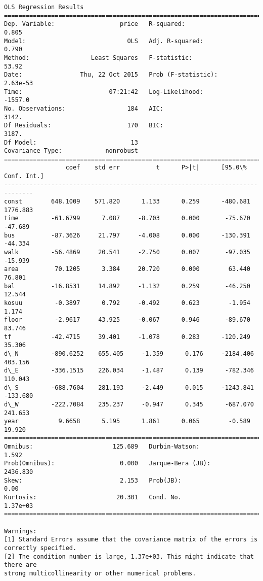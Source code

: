 \documentclass[a4paper,dvipdfmx]{jsarticle}
\begin{document}
    \begin{Verbatim}[commandchars=\\\{\}]
OLS Regression Results                            
==============================================================================
Dep. Variable:                  price   R-squared:                       0.805
Model:                            OLS   Adj. R-squared:                  0.790
Method:                 Least Squares   F-statistic:                     53.92
Date:                Thu, 22 Oct 2015   Prob (F-statistic):           2.63e-53
Time:                        07:21:42   Log-Likelihood:                -1557.0
No. Observations:                 184   AIC:                             3142.
Df Residuals:                     170   BIC:                             3187.
Df Model:                          13                                         
Covariance Type:            nonrobust                                         
==============================================================================
                 coef    std err          t      P>|t|      [95.0\% Conf. Int.]
------------------------------------------------------------------------------
const        648.1009    571.820      1.133      0.259      -480.681  1776.883
time         -61.6799      7.087     -8.703      0.000       -75.670   -47.689
bus          -87.3626     21.797     -4.008      0.000      -130.391   -44.334
walk         -56.4869     20.541     -2.750      0.007       -97.035   -15.939
area          70.1205      3.384     20.720      0.000        63.440    76.801
bal          -16.8531     14.892     -1.132      0.259       -46.250    12.544
kosuu         -0.3897      0.792     -0.492      0.623        -1.954     1.174
floor         -2.9617     43.925     -0.067      0.946       -89.670    83.746
tf           -42.4715     39.401     -1.078      0.283      -120.249    35.306
d\_N         -890.6252    655.405     -1.359      0.176     -2184.406   403.156
d\_E         -336.1515    226.034     -1.487      0.139      -782.346   110.043
d\_S         -688.7604    281.193     -2.449      0.015     -1243.841  -133.680
d\_W         -222.7084    235.237     -0.947      0.345      -687.070   241.653
year           9.6658      5.195      1.861      0.065        -0.589    19.920
==============================================================================
Omnibus:                      125.689   Durbin-Watson:                   1.592
Prob(Omnibus):                  0.000   Jarque-Bera (JB):             2436.830
Skew:                           2.153   Prob(JB):                         0.00
Kurtosis:                      20.301   Cond. No.                     1.37e+03
==============================================================================

Warnings:
[1] Standard Errors assume that the covariance matrix of the errors is correctly specified.
[2] The condition number is large, 1.37e+03. This might indicate that there are
strong multicollinearity or other numerical problems.
    \end{Verbatim}
\end{document}
